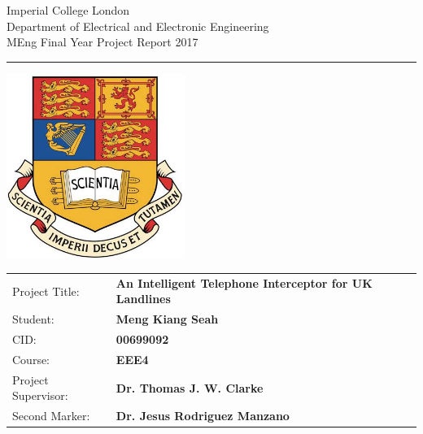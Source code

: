 \documentclass[12pt,a4paper]{report}
\begin{document}
\begin{titlepage}
    \setlength{\parindent}{0pt}
    \setlength{\parskip}{0pt}

    {
    \Large
    \raggedright
    Imperial College London\\[17pt]
    Department of Electrical and Electronic Engineering\\[17pt]
    MEng Final Year Project Report 2017\\[17pt]
    }

    \rule{\columnwidth}{3pt}
    \vfill
    \centering
      \includegraphics[width=0.7\columnwidth,height=60mm,keepaspectratio]{icl.jpg}
    \vfill
    \setlength{\tabcolsep}{0pt}

    \begin{tabular}{p{40mm}p{\dimexpr\columnwidth-40mm}}
	    Project Title: & \textbf{An Intelligent Telephone Interceptor for UK Landlines}\\[12pt]
	    Student: & \textbf{Meng Kiang Seah} \\[12pt]
	    CID: & \textbf{00699092} \\[12pt]
	    Course: & \textbf{EEE4} \\[12pt]
	    Project Supervisor: & \textbf{Dr. Thomas J. W. Clarke} \\[12pt]
	    Second Marker: & \textbf{Dr. Jesus Rodriguez Manzano} \\
    \end{tabular}
\end{titlepage}


\end{document}
